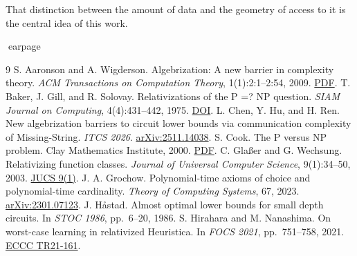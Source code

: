 \documentclass[11pt,a4paper]{article}
\begin{document}
That distinction between the amount of data and the geometry of access to it is the central idea of this work.

earpage
\begin{thebibliography}{9}
 S. Aaronson and A. Wigderson. Algebrization: A new barrier in complexity theory. \textit{ACM Transactions on Computation Theory}, 1(1):2:1--2:54, 2009. \href{https://www.scottaaronson.com/papers/alg.pdf}{PDF}.
 T. Baker, J. Gill, and R. Solovay. Relativizations of the P =? NP question. \textit{SIAM Journal on Computing}, 4(4):431--442, 1975. \href{https://epubs.siam.org/doi/10.1137/0204037}{DOI}.
 L. Chen, Y. Hu, and H. Ren. New algebrization barriers to circuit lower bounds via communication complexity of Missing-String. \textit{ITCS 2026}. \href{https://arxiv.org/abs/2511.14038}{arXiv:2511.14038}.
 S. Cook. The P versus NP problem. Clay Mathematics Institute, 2000. \href{https://www.claymath.org/wp-content/uploads/2022/06/pvsnp.pdf}{PDF}.
 C. Glaßer and G. Wechsung. Relativizing function classes. \textit{Journal of Universal Computer Science}, 9(1):34--50, 2003. \href{https://lib.jucs.org/issue/4069/}{JUCS 9(1)}.
 J. A. Grochow. Polynomial-time axioms of choice and polynomial-time cardinality. \textit{Theory of Computing Systems}, 67, 2023. \href{https://arxiv.org/abs/2301.07123}{arXiv:2301.07123}.
 J. H\aa stad. Almost optimal lower bounds for small depth circuits. In \textit{STOC 1986}, pp.~6--20, 1986.
 S. Hirahara and M. Nanashima. On worst-case learning in relativized Heuristica. In \textit{FOCS 2021}, pp.~751--758, 2021. \href{https://eccc.weizmann.ac.il/report/2021/161/download}{ECCC TR21-161}.
\end{thebibliography}
\end{document}
